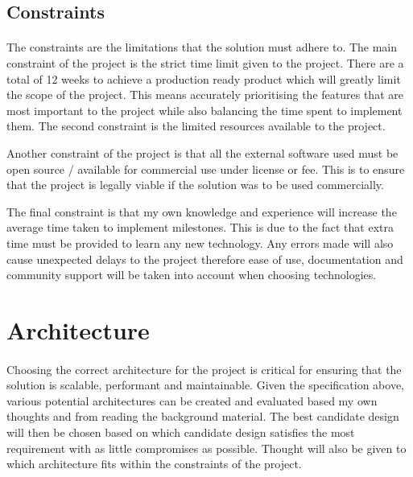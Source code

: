 \documentclass[12pt, conference, final, a4paper, onecolumn, compsoc]{IEEEtran}
\begin{document}
\subsection*{Constraints}
\paragraph{}


The constraints are the limitations that the solution must adhere to. The main
constraint of the project is the strict time limit given to the project. There
are a total of 12 weeks to achieve a production ready product which will greatly
limit the scope of the project. This means accurately prioritising the features
that are most important to the project while also balancing the time spent to
implement them. The second constraint is the limited resources available to the
project.

Another constraint of the project is that all the external software used must be
open source / available for commercial use under license or fee. This is to
ensure that the project is legally viable if the solution was to be used
commercially.

The final constraint is that my own knowledge and experience will increase the
average time taken to implement milestones. This is due to the fact that extra
time must be provided to learn any new technology. Any errors made will also
cause unexpected delays to the project therefore ease of use, documentation and
community support will be taken into account when choosing technologies.


\section{Architecture}

\paragraph{}
Choosing the correct architecture for the project is critical for ensuring that
the solution is scalable, performant and maintainable. Given the specification
above, various potential architectures can be created and evaluated based my own
thoughts and from reading the background material. The best candidate design
will then be chosen based on which candidate design satisfies the most
requirement with as little compromises as possible. Thought will also be given
to which architecture fits within the constraints of the project.
\end{document}
